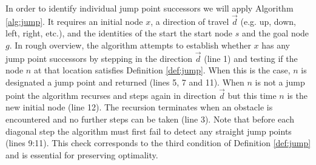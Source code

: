 In order to identify individual jump point successors we will apply Algorithm
\ref{alg:jump}. It requires an initial node $x$, a direction of travel
$\vec{d}$ (e.g. up, down, left, right, etc.), and the identities of the start
the start node $s$ and the goal node $g$.
In rough overview, the algorithm attempts to establish whether $x$ has any 
jump point successors by stepping in the direction $\vec{d}$ (line 1) and testing
if the node $n$ at that location satisfies Definition \ref{def:jump}.
When this is the case, $n$ is designated a jump point and returned (lines 5, 7
and 11).
When $n$ is not a jump point the algorithm recurses and steps again in direction
$\vec{d}$ but this time $n$ is the new initial node (line 12).
The recursion terminates when an obstacle is encountered and no further
steps can be taken (line 3).
Note that before each diagonal step the algorithm must first 
fail to detect any straight jump points (lines 9:11). 
This check corresponds to the third condition of Definition \ref{def:jump} 
and is essential for preserving optimality.
